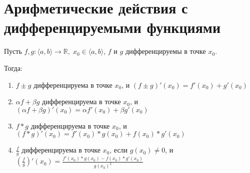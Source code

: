 \section{Арифметические действия с дифференцируемыми функциями}
Пусть $f, g: \langle a, b \rangle \to \mathbb{R}, \; x_0 \in \langle a, b \rangle$, $f$ и $g$ дифференцируемы в точке $x_0$.

Тогда:
\begin{enumerate}
    \item $f \pm g$ дифференцируема в точке $x_0$, и $(f \pm g)'(x_0) = f'(x_0) + g'(x_0)$
    \item $\alpha f + \beta g$ дифференцируема в точке $x_0$, и $(\alpha f + \beta g)'(x_0) = \alpha f'(x_0) + \beta g'(x_0)$
    \item $f * g$ дифференцируема в точке $x_0$, и $(f * g)'(x_0) = f'(x_0) * g(x_0) + f(x_0) * g'(x_0)$
    \item $\frac{f}{g}$ дифференцируема в точке $x_0$, если $g(x_0) \neq 0$, и $(\frac{f}{g})'(x_0) = \frac{f'(x_0) * g(x_0) - f(x_0) * g'(x_0)}{g(x_0)^2}$
\end{enumerate}
